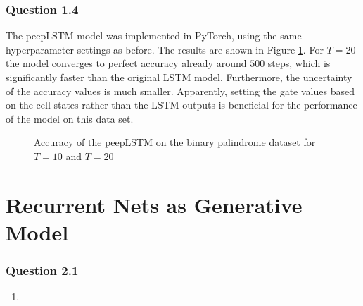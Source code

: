 \documentclass{article}
\begin{document}
\subsubsection*{Question 1.4}
The peepLSTM model was implemented in PyTorch, using the same hyperparameter settings as before. The results are shown in Figure \ref{fig:peeplstm}. For $T = 20$ the model converges to perfect accuracy already around $500$ steps, which is significantly faster than the original LSTM model. Furthermore, the uncertainty of the accuracy values is much smaller. Apparently, setting the gate values based on the cell states rather than the LSTM outputs is beneficial for the performance of the model on this data set.
\begin{figure}[h]
	\centering
	\caption{Accuracy of the peepLSTM on the binary palindrome dataset for $T=10$ and $T = 20$}
	\label{fig:peeplstm}
\end{figure}
\section{Recurrent Nets as Generative Model}
\subsubsection*{Question 2.1}
\begin{enumerate}[label = (\alph*)]
	\item 
\end{enumerate}
\end{document}
